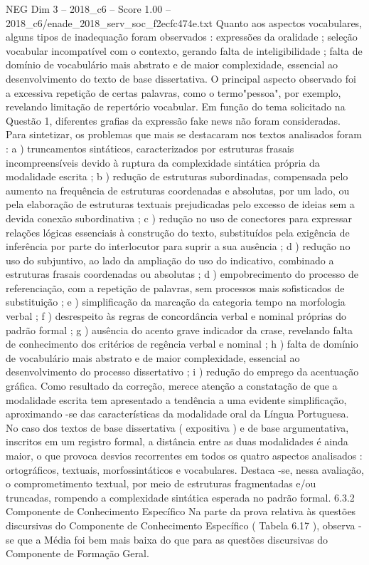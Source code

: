 \begin{textsample}{NEG Dim 3 – 2018\_c6 – Score 1.00 – 2018\_c6/enade\_2018\_serv\_soc\_f2ecfc474e.txt}
Quanto aos aspectos vocabulares, alguns tipos de inadequação foram observados : expressões da oralidade ; seleção vocabular incompatível com o contexto, gerando falta de inteligibilidade ; falta de domínio de vocabulário mais abstrato e de maior complexidade, essencial ao desenvolvimento do texto de base dissertativa.
O principal aspecto observado foi a excessiva repetição de certas palavras, como o termo"pessoa", por exemplo, revelando limitação de repertório vocabular.
Em função do tema solicitado na Questão 1, diferentes grafias da expressão fake news não foram consideradas.
Para sintetizar, os problemas que mais se destacaram nos textos analisados foram : a ) truncamentos sintáticos, caracterizados por estruturas frasais incompreensíveis devido à ruptura da complexidade sintática própria da modalidade escrita ; b ) redução de estruturas subordinadas, compensada pelo aumento na frequência de estruturas coordenadas e absolutas, por um lado, ou pela elaboração de estruturas textuais prejudicadas pelo excesso de ideias sem a devida conexão subordinativa ; c ) redução no uso de conectores para expressar relações lógicas essenciais à construção do texto, substituídos pela exigência de inferência por parte do interlocutor para suprir a sua ausência ; d ) redução no uso do subjuntivo, ao lado da ampliação do uso do indicativo, combinado a estruturas frasais coordenadas ou absolutas ; d ) empobrecimento do processo de referenciação, com a repetição de palavras, sem processos mais sofisticados de substituição ; e ) simplificação da marcação da categoria tempo na morfologia verbal ; f ) desrespeito às regras de concordância verbal e nominal próprias do padrão formal ; g ) ausência do acento grave indicador da crase, revelando falta de conhecimento dos critérios de regência verbal e nominal ; h ) falta de domínio de vocabulário mais abstrato e de maior complexidade, essencial ao desenvolvimento do processo dissertativo ; i ) redução do emprego da acentuação gráfica.
Como resultado da correção, merece atenção a constatação de que a modalidade escrita tem apresentado a tendência a uma evidente simplificação, aproximando -se das características da modalidade oral da Língua Portuguesa.
No caso dos textos de base dissertativa ( expositiva ) e de base argumentativa, inscritos em um registro formal, a distância entre as duas modalidades é ainda maior, o que provoca desvios recorrentes em todos os quatro aspectos analisados : ortográficos, textuais, morfossintáticos e vocabulares.
Destaca -se, nessa avaliação, o comprometimento textual, por meio de estruturas fragmentadas e/ou truncadas, rompendo a complexidade sintática esperada no padrão formal. 6.3.2 Componente de Conhecimento Específico Na parte da prova relativa às questões discursivas do Componente de Conhecimento Específico ( Tabela 6.17 ), observa -se que a Média foi bem mais baixa do que para as questões discursivas do Componente de Formação Geral.

\end{textsample}
